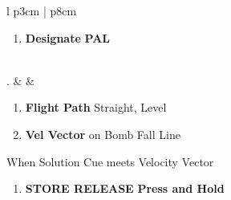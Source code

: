 \documentclass[8pt,usenames,dvipsnames,twoside]{article}
\begin{document}
\begin{center}
\begin{tabular}{l p{3cm} | p{8cm}}
\begin{minipage}[t]{\linewidth}
\begin{enumerate}[label=(\alph*)]
						\item \textbf{Designate} \dotfill \textbf{PAL}
					\end{enumerate}
				\end{minipage} \\
				. &  &
				\begin{minipage}[t]{\linewidth}
					\vspace{-7pt}
					\begin{enumerate}[label=(\alph*)]
						\item \textbf{Flight Path} \dotfill Straight, Level
						\item \textbf{Vel Vector} \dotfill on Bomb Fall Line
					\end{enumerate}
					When Solution Cue meets Velocity Vector
					\begin{enumerate}[label=(\alph*), resume]
						\item \textbf{STORE RELEASE} \dotfill \textbf{Press and Hold}
					\end{enumerate}
				\end{minipage} \\
				\bottomrule
			\end{tabular}
		\end{center}	
		
		\clearpage 
		
\end{document}

